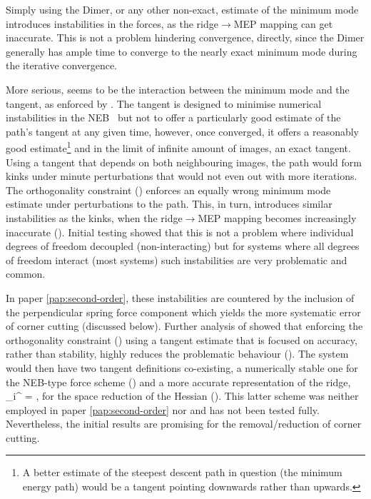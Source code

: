 Simply using the Dimer, or any other non-exact, estimate of the minimum mode introduces instabilities in the forces, as the ridge$\rightarrow$MEP mapping can get inaccurate.
This is not a problem hindering convergence, directly, since the Dimer generally has ample time to converge to the nearly exact minimum mode during the iterative convergence.

More serious, seems to be the interaction between the minimum mode and the tangent, as enforced by .
The tangent is designed to minimise numerical instabilities in the NEB~\cite{neb-tangent-2000} but not to offer a particularly good estimate of the path's tangent at any given time, however, once converged, it offers a reasonably good estimate\footnote{A better estimate of the steepest descent path in question (the minimum energy path) would be a tangent pointing downwards rather than upwards.} and in the limit of infinite amount of images, an exact tangent.
Using a tangent that depends on both neighbouring images, the path would form kinks under minute perturbations that would not even out with more iterations.
The orthogonality constraint () enforces an equally wrong minimum mode estimate under perturbations to the path.
This, in turn, introduces similar instabilities as the kinks, when the ridge$\rightarrow$MEP mapping becomes increasingly inaccurate ().
Initial testing showed that this is not a problem where individual degrees of freedom decoupled (non-interacting) but for systems where all degrees of freedom interact (most systems) such instabilities are very problematic and common.

In paper \ref{pap:second-order}, these instabilities are countered by the inclusion of the perpendicular spring force component which yields the more systematic error of corner cutting (discussed below).
Further analysis of showed that enforcing the orthogonality constraint () using a tangent estimate that is focused on accuracy, rather than stability, highly reduces the problematic behaviour ().
The system would then have two tangent definitions co-existing, a numerically stable one for the NEB-type force scheme () and a more accurate representation of the ridge,
\uvt_i^ = ,
\eeq
for the space reduction of the Hessian ().
This latter scheme was neither employed in paper \ref{pap:second-order} nor  and has not been tested fully.
Nevertheless, the initial results are promising for the removal/reduction of corner cutting.


